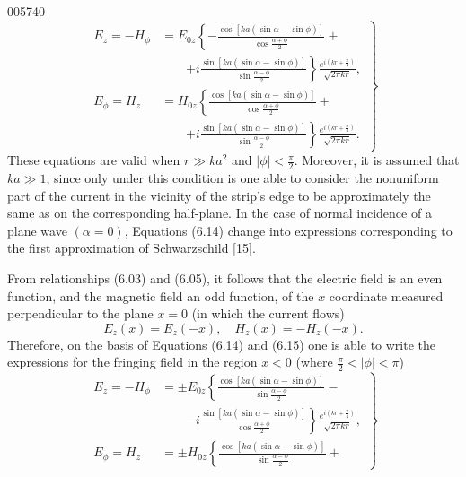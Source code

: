 \begin{scanpage}{0057}{40}
\[\left.\begin{aligned}E_z=-H_\phi&=E_{0z}\left\{-\frac{\cos[ka(\sin\alpha-\sin\phi)]}{\cos\frac{\alpha+\phi}{2}}+\right.\\&\qquad\left.+i\frac{\sin[ka(\sin\alpha-\sin\phi)]}{\sin\frac{\alpha-\phi}{2}}\right\}\frac{e^{i(kr+\frac\pi4)}}{\sqrt{2\pi kr}},\\E_\phi=H_z&=H_{0z}\left\{\frac{\cos[ka(\sin\alpha-\sin\phi)]}{\cos\frac{\alpha+\phi}{2}}+\right.\\&\qquad\left.+i\frac{\sin[ka(\sin\alpha-\sin\phi)]}{\sin\frac{\alpha-\phi}{2}}\right\}\frac{e^{i(kr+\frac\pi4)}}{\sqrt{2\pi kr}}.\end{aligned}\right\}\tag{6.14}\]
These equations are valid when $r\gg ka^2$ and $|\phi|<\frac\pi2$. Moreover, it is assumed that $ka\gg1$, since only under this condition is one able to consider the nonuniform part of the current in the vicinity of the strip's edge to be approximately the same as on the corresponding half-plane. In the case of normal incidence of a plane wave $(\alpha=0)$, Equations (6.14) change into expressions corresponding to the first approximation of Schwarzschild [15].

From relationships (6.03) and (6.05), it follows that the electric field is an even function, and the magnetic field an odd function, of the $x$ coordinate measured perpendicular to the plane $x=0$ (in which the current flows)
\[E_z(x)=E_z(-x),\quad H_z(x)=-H_z(-x).\tag{6.15}\]
Therefore, on the basis of Equations (6.14) and (6.15) one is able to write the expressions for the fringing field in the region $x<0$ (where $\frac\pi2<|\phi|<\pi$)
\[\left.\begin{aligned}E_z=-H_\phi&=\pm E_{0z}\left\{\frac{\cos[ka(\sin\alpha-\sin\phi)]}{\sin\frac{\alpha-\phi}{2}}-\right.\\&\qquad\left.-i\frac{\sin[ka(\sin\alpha-\sin\phi)]}{\cos\frac{\alpha+\phi}{2}}\right\}\frac{e^{i(kr+\frac\pi4)}}{\sqrt{2\pi kr}},\\E_\phi=H_z&=\pm H_{0z}\left\{\frac{\cos[ka(\sin\alpha-\sin\phi)]}{\sin\frac{\alpha-\phi}{2}}+\right.\end{aligned}\right\}\tag{6.16}\]
\end{scanpage}
